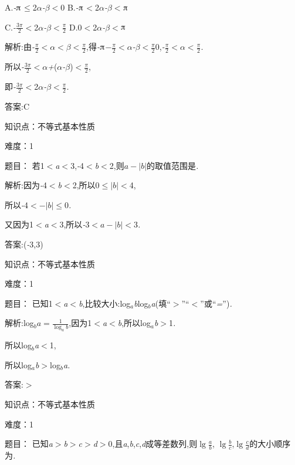 \documentclass{article} %
\begin{document}
 A.\textit{-}$\piup$$\mathrm{\le}$2\textit{$\alpha$-$\beta$$<$}0 B.\textit{-}$\piup$\textit{$<$}2\textit{$\alpha$-$\beta$$<$}$\piup$

 C.\textit{-}\textit{$\frac{3\pi}{2}<$}2\textit{$\alpha$-$\beta$$<\frac{\pi}{2}$} D.0\textit{$<$}2\textit{$\alpha$-$\beta$$<$}$\piup$

 解析:由\textit{-}\textit{$\frac{\pi}{2}<$$\alpha$$<$$\beta$$<\frac{\pi}{2}$},得\textit{-}$\piup$\textit{$-\frac{\pi}{2}<$$\alpha$-$\beta$$<\frac{\pi}{2}$}0,\textit{-}\textit{$\frac{\pi}{2}<$$\alpha$$<\frac{\pi}{2}$}\textit{.}

所以\textit{-}\textit{$\frac{3\pi}{2}<$$\alpha$+}(\textit{$\alpha$-$\beta$})\textit{$<\frac{\pi}{2}$},

即\textit{-}\textit{$\frac{3\pi}{2}<$}2\textit{$\alpha$-$\beta$$<\frac{\pi}{2}$}\textit{.}

 答案:C


知识点：不等式基本性质

难度：1

题目： 若1\textit{$<$a$<$}3,\textit{-}4\textit{$<$b$<$}2,则\textit{$a-|b|$}的取值范围是\textit{\underbar{　　　　　}.~}

 解析:因为\textit{-}4\textit{$<$b$<$}2,所以0$\mathrm{\le}$\textit{$|b|<$}4,

所以\textit{-}4\textit{$<-|b|$}$\mathrm{\le}$0\textit{.}

又因为1\textit{$<$a$<$}3,所以\textit{-}3\textit{$<a-|b|<$}3\textit{.}

 答案:(\textit{-}3,3)

知识点：不等式基本性质

难度：1

题目： 
已知1\textit{$<$a$<$b},比较大小:log\textit{${}_{a}$b\underbar{　　　　　}}log\textit{${}_{b}$a}(填``\textit{$>$}''``\textit{$<$}''或``\textit{=}'')\textit{.~}

 解析:log\textit{${}_{b}a=\frac{1}{\log_ab}$},因为1\textit{$<$a$<$b},所以log\textit{${}_{a}$b$>$}1\textit{.}

所以log\textit{${}_{b}$a$<$}1,

所以log\textit{${}_{a}$b$>$}log\textit{${}_{b}$a.}

 答案:\textit{$>$}

知识点：不等式基本性质

难度：1

题目：
已知\textit{a$>$b$>$c$>$d$>$}0,且\textit{a},\textit{b},\textit{c},\textit{d}成等差数列,则$\lg\frac{a}{b}$, $\lg\frac{b}{c}$,$\lg\frac{c}{d}$的大小顺序为\textit{\underbar{　　　　　}.~}
\end{document}
